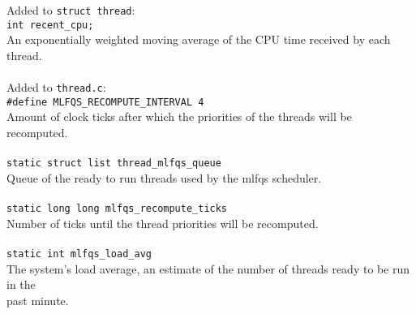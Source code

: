 \documentclass[a4wide, 11pt]{article}
\newcommand{\tab}{\hspace*{2em}}
\newcommand{\tx}{\texttt}
\begin{document}
Added to \tx{struct thread}: \\
\tab\tab \tx{int recent\_cpu;} \\
\tab\tab An exponentially weighted moving average of the CPU time received by each thread.
\\\\
Added to \tx{thread.c}: \\
\tab\tab \tx{\#define MLFQS\_RECOMPUTE\_INTERVAL 4} \\
\tab\tab Amount of clock ticks after which the priorities of the threads will be recomputed.
\\\\
\tab\tab \tx{static struct list thread\_mlfqs\_queue}\\
\tab\tab Queue of the ready to run threads used by the mlfqs scheduler.
\\\\
\tab\tab \tx{static long long mlfqs\_recompute\_ticks} \\
\tab\tab Number of ticks until the thread priorities will be recomputed.
\\\\
\tab\tab \tx{static int mlfqs\_load\_avg}\\
\tab\tab The system's load average, an estimate of the number of threads ready to be run in the \\
\tab\tab past minute.
\end{document}
